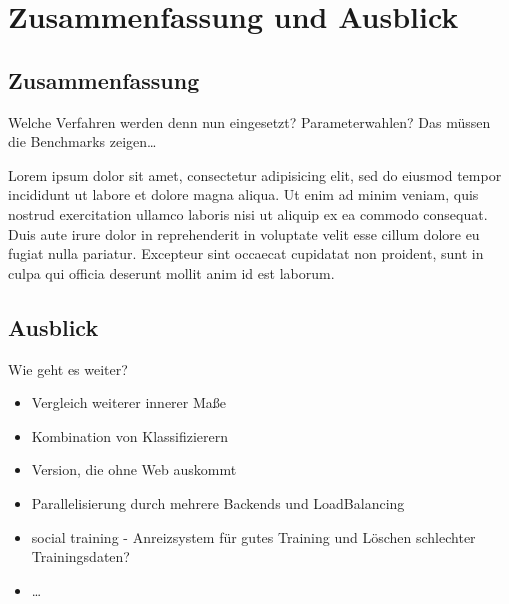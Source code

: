\chapter{Zusammenfassung und Ausblick}
\label{cha:ausblick}

\section{Zusammenfassung}

\TODO Welche Verfahren werden denn nun eingesetzt? Parameterwahlen? Das müssen die Benchmarks zeigen\dots

Lorem ipsum dolor sit amet, consectetur adipisicing elit, sed do eiusmod tempor incididunt ut labore et dolore magna aliqua. Ut enim ad minim veniam, quis nostrud exercitation ullamco laboris nisi ut aliquip ex ea commodo consequat. Duis aute irure dolor in reprehenderit in voluptate velit esse cillum dolore eu fugiat nulla pariatur. Excepteur sint occaecat cupidatat non proident, sunt in culpa qui officia deserunt mollit anim id est laborum.

\section{Ausblick}

\TODO Wie geht es weiter?

\begin{itemize}
  \item Vergleich weiterer innerer Maße
  \item Kombination von Klassifizierern
  \item Version, die ohne Web auskommt
  \item Parallelisierung durch mehrere Backends und LoadBalancing
  \item social training - Anreizsystem für gutes Training und Löschen schlechter Trainingsdaten?
  \item \dots
\end{itemize}